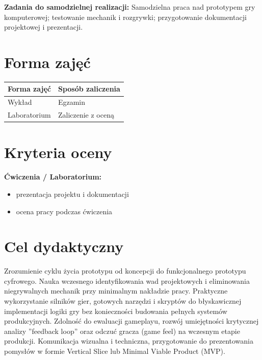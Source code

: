 \documentclass[12pt, a4paper]{article}
\newcommand{\thdrule}{\noalign{\global\setlength{\extrarowheight}{0pt}}}
\newcommand{\thdend}{\noalign{\global\setlength{\extrarowheight}{3pt}}}
\begin{document}
\vspace{4pt}
\noindent\textbf{Zadania do samodzielnej realizacji:} Samodzielna praca nad prototypem gry komputerowej; testowanie mechanik i rozgrywki; przygotowanie dokumentacji projektowej i prezentacji.

\section{Forma zajęć}

\begin{center}
{\scriptsize
\begin{tabular}{m{5cm}m{8cm}}
\thdrule\toprule
\rowcolor{pjatkRed} {\color{white}\textbf{Forma zajęć}} & {\color{white}\textbf{Sposób zaliczenia}} \\
\midrule\thdend
  \rowcolor{tableRowLight} Wykład & Egzamin \\
  \rowcolor{tableRowAlt} Laboratorium & Zaliczenie z oceną \\
\bottomrule
\end{tabular}}
\end{center}

\section{Kryteria oceny}

\textbf{Ćwiczenia / Laboratorium:}
\begin{itemize}
  \item prezentacja projektu i dokumentacji
  \item ocena pracy podczas ćwiczenia
\end{itemize}


\section{Cel dydaktyczny}

Zrozumienie cyklu życia prototypu od koncepcji do funkcjonalnego prototypu cyfrowego. Nauka wczesnego identyfikowania wad projektowych i eliminowania niegrywalnych mechanik przy minimalnym nakładzie pracy. Praktyczne wykorzystanie silników gier, gotowych narzędzi i skryptów do błyskawicznej implementacji logiki gry bez konieczności budowania pełnych systemów produkcyjnych. Zdolność do ewaluacji gameplayu, rozwój umiejętności krytycznej analizy ''feedback loop'' oraz odczuć gracza (game feel) na wczesnym etapie produkcji. Komunikacja wizualna i techniczna, przygotowanie do prezentowania pomysłów w formie Vertical Slice lub Minimal Viable Product (MVP).
\end{document}
